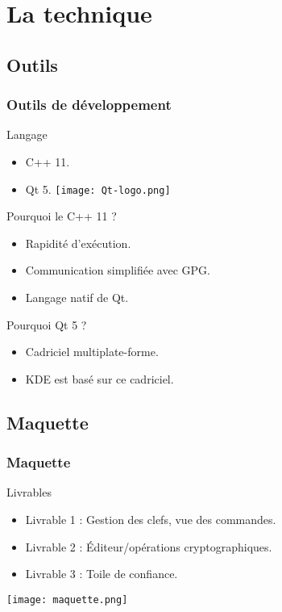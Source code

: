 \section{La technique}

\subsection{Outils}
\begin{frame}
  \frametitle{\color{white} Outils de développement}
  \begin{block}{Langage}
    \begin{itemize}
      \item C++ 11.
      \item Qt 5.
      \hfill
      \texttt{[image: Qt-logo.png]}
    \end{itemize}
  \end{block}
  \begin{block}{Pourquoi le C++ 11 ?}
    \begin{itemize}
      \item Rapidité d'exécution.
      \item Communication simplifiée avec GPG.
      \item Langage natif de Qt.
    \end{itemize}
  \end{block}
  \begin{block}{Pourquoi Qt 5 ?}
    \begin{itemize}
      \item Cadriciel multiplate-forme.
      \item KDE est basé sur ce cadriciel.
    \end{itemize}
  \end{block}
\end{frame}

\subsection{Maquette}
\begin{frame}
  \frametitle{\color{white} Maquette}
  \begin{block}{Livrables}
    \begin{itemize}
      \item Livrable 1 : Gestion des clefs, vue des commandes.
      \item Livrable 2 : Éditeur/opérations cryptographiques.
      \item Livrable 3 : Toile de confiance.
    \end{itemize}
  \end{block}
  \begin{center}
    \texttt{[image: maquette.png]}
  \end{center}
\end{frame}

